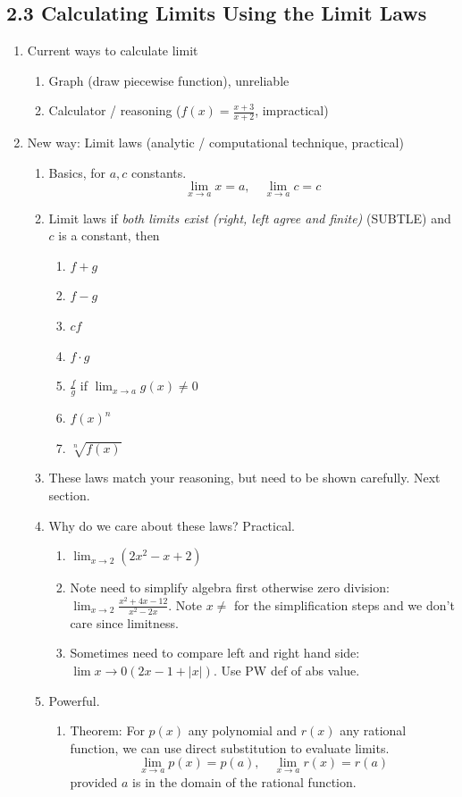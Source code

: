 \documentclass{article}
\newcommand{\ds}{\displaystyle}
\begin{document}
\noindent \subsection{2.3 Calculating Limits Using the Limit Laws}
\begin{enumerate}

\item Current ways to calculate limit
\begin{enumerate}
\item Graph (draw piecewise function), unreliable
\item Calculator / reasoning ($f(x) = \frac{x+3}{x+2}$, impractical)
\end{enumerate}

\item New way: Limit laws (analytic / computational technique, practical)
\begin{enumerate}
\item Basics, for $a,c$ constants.
$$
\lim_{x\rightarrow a} x = a,\quad \lim_{x\rightarrow a} c = c
$$
\item Limit laws if \emph{both limits exist (right, left agree and finite)} (SUBTLE) and $c$ is a constant, then 
\begin{enumerate}
\item $f+g$
\item $f-g$
\item $cf$
\item  $f\cdot g$
\item $\frac{f}{g}$ if $\lim_{x\rightarrow a} g(x) \neq 0$
\item $f(x)^n$
\item $\sqrt[n]{f(x)}$
\end{enumerate}
\item These laws match your reasoning, but need to be shown carefully. Next section.
\item Why do we care about these laws? Practical. 
\begin{enumerate}
\item $ \ds \lim_{x\rightarrow 2} \left( 2x^2 - x + 2\right) $
\item Note need to simplify algebra first otherwise zero division: $\ds \lim_{x \rightarrow 2} \frac{x^2 + 4x - 12}{x^2-2x}$. Note $x \neq$ for the simplification steps and we don't care since limitness.
\item Sometimes need to compare left and right hand side: $\ds \lim{x\rightarrow 0} \left(2x-1+|x|\right)$. Use PW def of abs value.
\end{enumerate}
\item Powerful.
\begin{enumerate}
\item Theorem: For $p(x)$ any polynomial and $r(x)$ any rational function, we can use direct substitution to evaluate limits.
\[
\lim_{x\rightarrow a} p(x) = p(a), \quad \lim_{x\rightarrow a} r(x) = r(a)
\]
provided $a$ is in the domain of the rational function. 
\end{enumerate}
\end{enumerate}


\end{enumerate}
\end{document}
